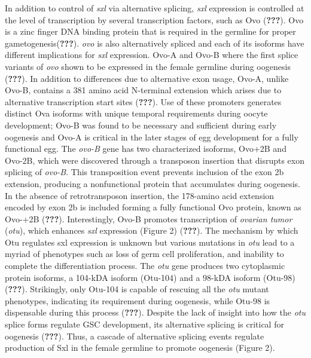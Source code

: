\documentclass[12pt,oneside]{reedthesis}
\begin{document}
In addition to control of \emph{sxl} via alternative splicing, \emph{sxl}
expression is controlled at the level of transcription by several
transcription factors, such as Ovo ({\textbf{???}}). Ovo is a zinc
finger DNA binding protein that is required in the germline for proper
gametogenesis({\textbf{???}}). \emph{ovo} is also alternatively spliced and
each of its isoforms have different implications for \emph{sxl} expression.
Ovo-A and Ovo-B where the first splice variants of \emph{ovo} shown to be
expressed in the female germline during oogenesis ({\textbf{???}}). In
addition to differences due to alternative exon usage, Ovo-A, unlike
Ovo-B, contains a 381 amino acid N-terminal extension which arises due
to alternative transcription start sites ({\textbf{???}}). Use of
these promoters generates distinct Ova isoforms with unique temporal
requirements during oocyte development; Ovo-B was found to be necessary
and sufficient during early oogenesis and Ovo-A is critical in the later
stages of egg development for a fully functional egg. The \emph{ovo-B} gene
has two characterized isoforms, Ovo+2B and Ovo-2B, which were discovered
through a transposon insertion that disrupts exon splicing of \emph{ovo-B}.
This transposition event prevents inclusion of the exon 2b extension,
producing a nonfunctional protein that accumulates during oogenesis. In
the absence of retrotransposon insertion, the 178-amino acid extension
encoded by exon 2b is included forming a fully functional Ovo protein,
known as Ovo-+2B ({\textbf{???}}). Interestingly, Ovo-B promotes
transcription of \emph{ovarian tumor} (\emph{otu}), which enhances \emph{sxl}
expression (Figure 2) ({\textbf{???}}). The mechanism by which Otu regulates
sxl expression is unknown but various mutations in \emph{otu} lead to a
myriad of phenotypes such as loss of germ cell proliferation, and
inability to complete the differentiation process. The \emph{otu} gene
produces two cytoplasmic protein isoforms, a 104-kDA isoform (Otu-104)
and a 98-kDA isoform (Otu-98) ({\textbf{???}}). Strikingly, only
Otu-104 is capable of rescuing all the \emph{otu} mutant phenotypes,
indicating its requirement during oogenesis, while Otu-98 is dispensable
during this process ({\textbf{???}}). Despite the lack of insight into
how the \emph{otu} splice forms regulate GSC development, its alternative
splicing is critical for oogenesis ({\textbf{???}}). Thus, a cascade of
alternative splicing events regulate production of Sxl in the female
germline to promote oogenesis (Figure 2).
\end{document}
